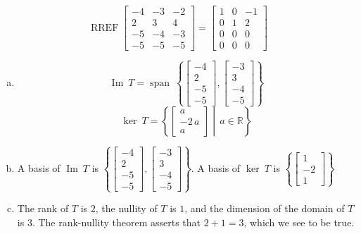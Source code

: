 \begin{exerciseAnswer} 


\[\operatorname{RREF} \left[\begin{array}{ccc}
-4 & -3 & -2 \\
2 & 3 & 4 \\
-5 & -4 & -3 \\
-5 & -5 & -5
\end{array}\right] = \left[\begin{array}{ccc}
1 & 0 & -1 \\
0 & 1 & 2 \\
0 & 0 & 0 \\
0 & 0 & 0
\end{array}\right] \]


\begin{enumerate}[(a)]
\item \[\operatorname{Im}\ T = \operatorname{span}\  \left\{ \left[\begin{array}{c}
-4 \\
2 \\
-5 \\
-5
\end{array}\right] , \left[\begin{array}{c}
-3 \\
3 \\
-4 \\
-5
\end{array}\right] \right\} \]\[\operatorname{ker}\ T =  \left\{ \left[\begin{array}{c}
a \\
-2 \, a \\
a
\end{array}\right] \middle|\,a\in\mathbb{R}\right\} \]
\item  A basis of \(\operatorname{Im}\ T\) is \( \left\{ \left[\begin{array}{c}
-4 \\
2 \\
-5 \\
-5
\end{array}\right] , \left[\begin{array}{c}
-3 \\
3 \\
-4 \\
-5
\end{array}\right] \right\} \). A basis of \(\operatorname{ker}\ T\) is \( \left\{ \left[\begin{array}{c}
1 \\
-2 \\
1
\end{array}\right] \right\} \)
\item  The rank of \(T\) is \( 2 \), the nullity of \(T\) is \( 1 \), and the dimension of the domain of \(T\) is \( 3 \). The rank-nullity theorem asserts that \( 2 + 1 = 3 \), which we see to be true. 
\end{enumerate}
    
\end{exerciseAnswer}
    
